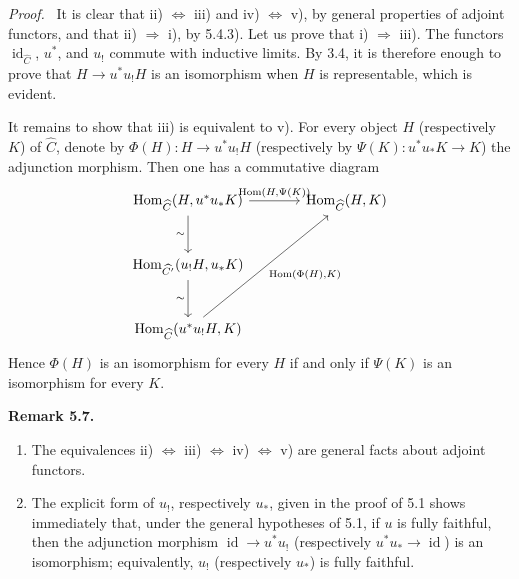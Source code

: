 \documentclass[11pt]{article}
\newcommand{\Hom}{\operatorname{Hom}}
\newcommand{\id}{\operatorname{id}}
\newenvironment{statement}[1]{\par\medskip\noindent\textbf{#1.}\ }{\par\medskip}
\newenvironment{proofsketch}{\par\noindent\emph{Proof.}\ }{\par\medskip}
\begin{document}
\begin{proofsketch}
It is clear that ii) $\Leftrightarrow$ iii) and iv) $\Leftrightarrow$ v), by general properties of adjoint functors, and that ii) $\Rightarrow$ i), by 5.4.3). Let us prove that i) $\Rightarrow$ iii). The functors $\id_{\widehat C}$, $u^*$, and $u_!$ commute with inductive limits. By 3.4, it is therefore enough to prove that $H\to u^*u_!H$ is an isomorphism when $H$ is representable, which is evident.

It remains to show that iii) is equivalent to v). For every object $H$ (respectively $K$) of $\widehat C$, denote by $\Phi(H):H\to u^*u_!H$ (respectively by $\Psi(K):u^*u_*K\to K$) the adjunction morphism. Then one has a commutative diagram
\[
\begin{tikzcd}[column sep=large,row sep=large]
\Hom_{\widehat C}(H,u^*u_*K)\arrow[r,"{\Hom(H,\Psi(K))}"]\arrow[d,"\sim"']&\Hom_{\widehat C}(H,K)\\
\Hom_{\widehat{C'}}(u_!H,u_*K)\arrow[d,"\sim"']&{}\\
\Hom_{\widehat C}(u^*u_!H,K)\arrow[uur,"{\Hom(\Phi(H),K)}"']&{}
\end{tikzcd}
\]
Hence $\Phi(H)$ is an isomorphism for every $H$ if and only if $\Psi(K)$ is an isomorphism for every $K$.
\end{proofsketch}

\begin{statement}{Remark 5.7}
\begin{enumerate}[label=\alph*)]
\item The equivalences ii) $\Leftrightarrow$ iii) $\Leftrightarrow$ iv) $\Leftrightarrow$ v) are general facts about adjoint functors.
\item The explicit form of $u_!$, respectively $u_*$, given in the proof of 5.1 shows immediately that, under the general hypotheses of 5.1, if $u$ is fully faithful, then the adjunction morphism $\id\to u^*u_!$ (respectively $u^*u_*\to\id$) is an isomorphism; equivalently, $u_!$ (respectively $u_*$) is fully faithful.
\end{enumerate}
\end{statement}
\end{document}
